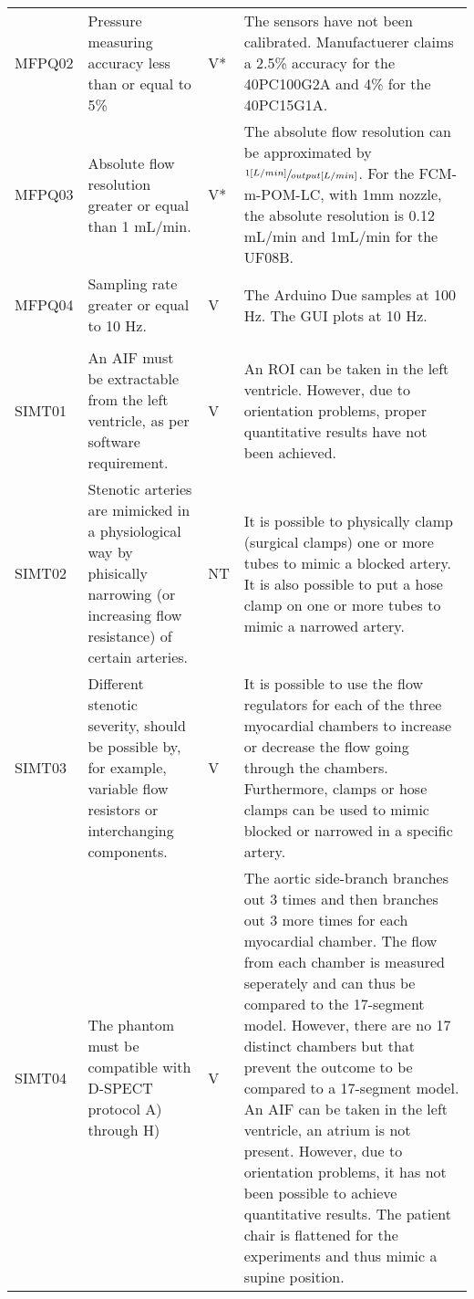\begin{longtable}{m{1.5cm}|m{5.25cm}>{\centering\arraybackslash}m{1cm}m{5.75cm}|}
		MFPQ02	& Pressure measuring accuracy less than or equal to 5\% & \cellcolor{yellow!50}V* & The sensors have not been calibrated. Manufactuerer claims a 2.5\%  accuracy for the 40PC100G2A and 4\% for the 40PC15G1A. \\
		MFPQ03	& Absolute flow resolution greater or equal than 1 mL/min. & \cellcolor{yellow!50}V* & The absolute flow resolution can be approximated by $\sfrac{1 [L/min]}{output [L/min]}$. For the FCM-m-POM-LC, with 1mm nozzle, the absolute resolution is 0.12 mL/min and 1mL/min for the UF08B.\\
		MFPQ04	& Sampling rate greater or equal to 10 Hz. & \cellcolor{green!50}V & The Arduino Due samples at 100 Hz. The GUI plots at 10 Hz. \\
					& & & \\
		SIMT01	& An AIF must be extractable from the left ventricle, as per software requirement. & \cellcolor{green!50}V & An ROI can be taken in the left ventricle. However, due to orientation problems, proper quantitative results have not been achieved. \\
		SIMT02	& Stenotic arteries are mimicked in a physiological way by phisically narrowing (or increasing flow resistance) of certain arteries. & \cellcolor{blue!50}NT & It is possible to physically clamp (surgical clamps) one or more tubes to mimic a blocked artery. It is also possible to put a hose clamp on one or more tubes to mimic a narrowed artery. \\
		SIMT03	& Different stenotic severity, should be possible by, for example, variable flow resistors or interchanging components. & \cellcolor{green!50}V & It is possible to use the flow regulators for each of the three myocardial chambers to increase or decrease the flow going through the chambers. Furthermore, clamps or hose clamps can be used to mimic blocked or narrowed in a specific artery. \\
		SIMT04	& The phantom must be compatible with D-SPECT protocol A) through H) & \cellcolor{green!50}V & The aortic side-branch branches out 3 times and then branches out 3 more times for each myocardial chamber. The flow from each chamber is measured seperately and can thus be compared to the 17-segment model. However, there are no 17 distinct chambers but that prevent the outcome to be compared to a 17-segment model. An AIF can be taken in the left ventricle, an atrium is not present. However, due to orientation problems, it has not been possible to achieve quantitative results. The patient chair is flattened for the experiments and thus mimic a supine position.\\

\end{longtable}
